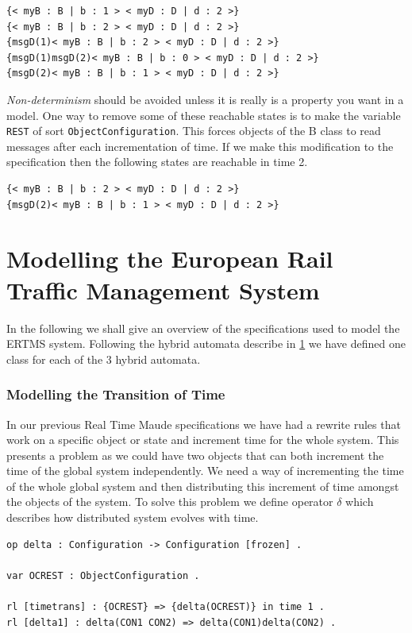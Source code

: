 \begin{lstlisting}[caption = Some of the states reachable by rewriting EXAMPLE1 in two time steps]
{< myB : B | b : 1 > < myD : D | d : 2 >}
{< myB : B | b : 2 > < myD : D | d : 2 >}
{msgD(1)< myB : B | b : 2 > < myD : D | d : 2 >}
{msgD(1)msgD(2)< myB : B | b : 0 > < myD : D | d : 2 >}
{msgD(2)< myB : B | b : 1 > < myD : D | d : 2 >}
\end{lstlisting}

\emph{Non-determinism} should be avoided unless it is really is a property you want in a model. One way to remove some of these reachable states is to make the variable \texttt{REST} of sort \texttt{ObjectConfiguration}. This forces objects of the B class to read messages after each incrementation of time. If we make this modification to the specification then the following states are reachable in time 2.
\begin{lstlisting}
{< myB : B | b : 2 > < myD : D | d : 2 >}
{msgD(2)< myB : B | b : 1 > < myD : D | d : 2 >}
\end{lstlisting}


\section{Modelling the European Rail Traffic Management System}
In the following we shall give an overview of the specifications used to model the ERTMS system. Following the hybrid automata describe in \ref{} we have defined one class for each of the 3 hybrid automata.
\subsubsection*{Modelling the Transition of Time}
In our previous Real Time Maude specifications we have had a rewrite rules that work on a specific object or state and increment time for the whole system. This presents a problem as we could have two objects that can both increment the time of the global system independently. We need a way of incrementing the time of the whole global system and then distributing this increment of time amongst the objects of the system. To solve this problem we define operator $\delta$ which describes how distributed system evolves with time.

\begin{lstlisting}[caption = The delta time transition operation, label = code:delta]
op delta : Configuration -> Configuration [frozen] . 

var OCREST : ObjectConfiguration .

rl [timetrans] : {OCREST} => {delta(OCREST)} in time 1 .
rl [delta1] : delta(CON1 CON2) => delta(CON1)delta(CON2) .
\end{lstlisting}

